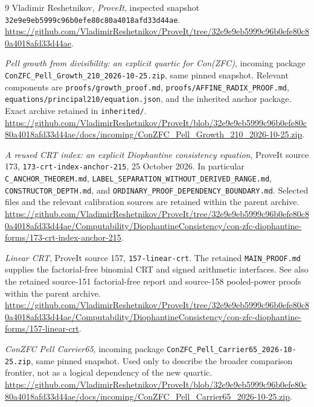 \documentclass[11pt]{article}
\theoremstyle{definition}
\theoremstyle{remark}
\begin{document}
\begin{thebibliography}{9}
Vladimir Reshetnikov, \emph{ProveIt}, inspected snapshot
\nolinkurl{32e9e9eb5999c96b0efe80c80a4018afd33d44ae}.
\url{https://github.com/VladimirReshetnikov/ProveIt/tree/32e9e9eb5999c96b0efe80c80a4018afd33d44ae}.

\emph{Pell growth from divisibility: an explicit quartic for Con(ZFC)},
incoming package \texttt{ConZFC\_Pell\_Growth\_210\_2026-10-25.zip},
same pinned snapshot. Relevant components are
\texttt{proofs/growth\_proof.md}, \texttt{proofs/AFFINE\_RADIX\_PROOF.md},
\texttt{equations/principal210/equation.json}, and the inherited anchor
package. Exact archive retained in \texttt{inherited/}.
\url{https://github.com/VladimirReshetnikov/ProveIt/blob/32e9e9eb5999c96b0efe80c80a4018afd33d44ae/docs/incoming/ConZFC_Pell_Growth_210_2026-10-25.zip}.

\emph{A reused CRT index: an explicit Diophantine consistency equation},
ProveIt source 173, \texttt{173-crt-index-anchor-215}, 25 October 2026.
In particular \texttt{C\_ANCHOR\_THEOREM.md},
\nolinkurl{LABEL_SEPARATION_WITHOUT_DERIVED_RANGE.md},
\texttt{CONSTRUCTOR\_DEPTH.md}, and
\nolinkurl{ORDINARY_PROOF_DEPENDENCY_BOUNDARY.md}.
Selected files and the relevant calibration sources are retained within
the parent archive.
\url{https://github.com/VladimirReshetnikov/ProveIt/tree/32e9e9eb5999c96b0efe80c80a4018afd33d44ae/Computability/DiophantineConsistency/con-zfc-diophantine-forms/173-crt-index-anchor-215}.

\emph{Linear CRT}, ProveIt source 157, \texttt{157-linear-crt}.
The retained \texttt{MAIN\_PROOF.md} supplies the factorial-free binomial
CRT and signed arithmetic interfaces. See also the retained source-151
factorial-free report and source-158 pooled-power proofs within the parent
archive.
\url{https://github.com/VladimirReshetnikov/ProveIt/tree/32e9e9eb5999c96b0efe80c80a4018afd33d44ae/Computability/DiophantineConsistency/con-zfc-diophantine-forms/157-linear-crt}.

\emph{ConZFC Pell Carrier65}, incoming package
\texttt{ConZFC\_Pell\_Carrier65\_2026-10-25.zip}, same pinned snapshot.
Used only to describe the broader comparison frontier, not as a logical
dependency of the new quartic.
\url{https://github.com/VladimirReshetnikov/ProveIt/blob/32e9e9eb5999c96b0efe80c80a4018afd33d44ae/docs/incoming/ConZFC_Pell_Carrier65_2026-10-25.zip}.
\end{thebibliography}
\end{document}
